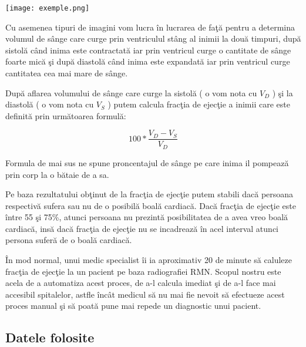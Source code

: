\begin{center}
\texttt{[image: exemple.png]}
\end{center}

Cu asemenea tipuri de imagini vom lucra \^{i}n lucrarea de fa\c{t}\u{a} pentru a determina volumul de s\^{a}nge care curge prin ventriculul st\^{a}ng al inimii la dou\u{a} timpuri, dup\u{a} sistol\u{a} c\^{a}nd inima este contractat\u{a} iar prin ventricul curge o cantitate de s\^{a}nge foarte mic\u{a} \c{s}i dup\u{a} diastol\u{a} c\^{a}nd inima este expandat\u{a} iar prin ventricul curge cantitatea cea mai mare de s\^{a}nge.
\par
Dup\u{a} aflarea volumului de s\^{a}nge care curge la sistol\u{a} ( o vom nota cu \textbf{\textit{$V_D$}} ) \c{s}i la diastol\u{a} ( o vom nota cu \textbf{\textit{$V_S$}} ) putem calcula frac\c{t}ia de ejec\c{t}ie a inimii care este definit\u{a} prin urm\u{a}toarea formul\u{a}:

$$100 * \frac{V_D - V_S}{V_D}$$

Formula de mai sus ne spune proncentajul de s\^{a}nge pe care inima il pompeaz\u{a} prin corp la o b\u{a}taie de a sa.
\par
Pe baza rezultatului ob\c{t}inut de la frac\c{t}ia de ejec\c{t}ie putem stabili dac\u{a} persoana respectiv\u{a} sufera sau nu de o posibil\u{a} boal\u{a} cardiac\u{a}. Dac\u{a} frac\c{t}ia de ejec\c{t}ie este \^{i}ntre 55 \c{s}i 75\%, atunci persoana nu prezint\u{a} posibilitatea de a avea vreo boal\u{a} cardiac\u{a}, ins\u{a} dac\u{a} frac\c{t}ia de ejec\c{t}ie nu se incadreaz\u{a} \^{i}n acel interval atunci persona sufer\u{a} de o boal\u{a} cardiac\u{a}.
\par
\^{I}n mod normal, unui medic specialist \^{i}i ia aproximativ 20 de minute s\u{a} caluleze frac\c{t}ia de ejec\c{t}ie la un pacient pe baza radiografiei RMN. Scopul nostru este acela de a automatiza acest proces, de a-l calcula imediat \c{s}i de a-l face mai accesibil spitalelor, astfle \^{i}nc\^{a}t medicul s\u{a} nu mai fie nevoit s\u{a} efectueze acest proces manual \c{s}i s\u{a} poat\u{a} pune mai repede un diagnostic unui pacient.

\subsection{Datele folosite}

